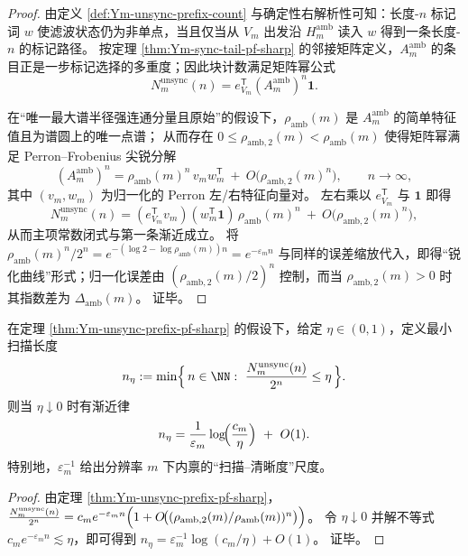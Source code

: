 \begin{proof}
由定义 \ref{def:Ym-unsync-prefix-count} 与确定性右解析性可知：长度-\(n\) 标记词 \(w\) 使滤波状态仍为非单点，当且仅当从 \(V_m\) 出发沿 \(H_m^{\mathrm{amb}}\) 读入 \(w\) 得到一条长度-\(n\) 的标记路径。
按定理 \ref{thm:Ym-sync-tail-pf-sharp} 的邻接矩阵定义，\(A_m^{\mathrm{amb}}\) 的条目正是一步标记选择的多重度；因此块计数满足矩阵幂公式
\[
N_m^{\mathrm{unsync}}(n)=e_{V_m}^{\mathsf T}(A_m^{\mathrm{amb}})^n\mathbf 1.
\]
\par
在“唯一最大谱半径强连通分量且原始”的假设下，\(\rho_{\mathrm{amb}}(m)\) 是 \(A_m^{\mathrm{amb}}\) 的简单特征值且为谱圆上的唯一点谱；
从而存在 \(0\le \rho_{\mathrm{amb},2}(m)<\rho_{\mathrm{amb}}(m)\) 使得矩阵幂满足 Perron--Frobenius 尖锐分解
\[
(A_m^{\mathrm{amb}})^n=\rho_{\mathrm{amb}}(m)^n\,v_m w_m^{\mathsf T}\ +\ O\!\bigl(\rho_{\mathrm{amb},2}(m)^n\bigr),
\qquad n\to\infty,
\]
其中 \((v_m,w_m)\) 为归一化的 Perron 左/右特征向量对。
左右乘以 \(e_{V_m}^{\mathsf T}\) 与 \(\mathbf 1\) 即得
\[
N_m^{\mathrm{unsync}}(n)
=(e_{V_m}^{\mathsf T}v_m)(w_m^{\mathsf T}\mathbf 1)\,\rho_{\mathrm{amb}}(m)^n\ +\ O\!\bigl(\rho_{\mathrm{amb},2}(m)^n\bigr),
\]
从而主项常数闭式与第一条渐近成立。
将 \(\rho_{\mathrm{amb}}(m)^n/2^n=e^{-(\log 2-\log\rho_{\mathrm{amb}}(m))n}=e^{-\varepsilon_m n}\) 与同样的误差缩放代入，即得“锐化曲线”形式；归一化误差由 \((\rho_{\mathrm{amb},2}(m)/2)^n\) 控制，而当 \(\rho_{\mathrm{amb},2}(m)>0\) 时其指数差为 \(\Delta_{\mathrm{amb}}(m)\)。
证毕。
\end{proof}

\begin{corollary}[给定清晰度阈值的渐近最优扫描长度]\label{cor:Ym-scan-length-asymptotic}
在定理 \ref{thm:Ym-unsync-prefix-pf-sharp} 的假设下，给定 \(\eta\in(0,1)\)，定义最小扫描长度
\[
n_{\eta}:=\min\Bigl\{\,n\in\NN:\ \frac{N_m^{\mathrm{unsync}}(n)}{2^n}\le \eta\,\Bigr\}.
\]
则当 \(\eta\downarrow 0\) 时有渐近律
\[
n_{\eta}
=\frac{1}{\varepsilon_m}\log\!\Bigl(\frac{c_m}{\eta}\Bigr)\ +\ O(1).
\]
特别地，\(\varepsilon_m^{-1}\) 给出分辨率 \(m\) 下内禀的“扫描--清晰度”尺度。
\end{corollary}

\begin{proof}
由定理 \ref{thm:Ym-unsync-prefix-pf-sharp}，
\(
\frac{N_m^{\mathrm{unsync}}(n)}{2^n}
=c_m e^{-\varepsilon_m n}\Bigl(1+O\!\bigl((\rho_{\mathrm{amb},2}(m)/\rho_{\mathrm{amb}}(m))^{n}\bigr)\Bigr)
\)。
令 \(\eta\downarrow 0\) 并解不等式 \(c_m e^{-\varepsilon_m n}\lesssim \eta\)，即可得到
\(
n_{\eta}=\varepsilon_m^{-1}\log(c_m/\eta)+O(1)
\)。
证毕。
\end{proof}


